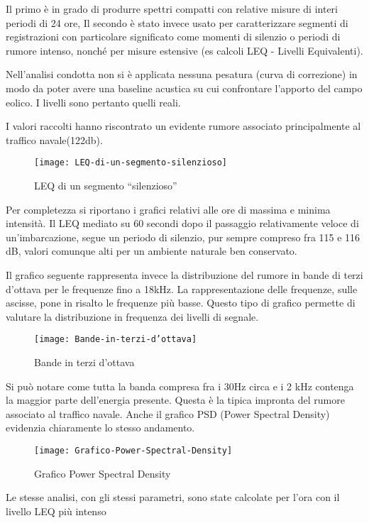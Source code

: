 Il primo è in grado di produrre spettri compatti con relative misure di interi periodi di 24 ore, Il secondo è stato invece usato per caratterizzare segmenti di registrazioni con particolare significato come momenti di silenzio o periodi di rumore intenso, nonché per misure estensive (es calcoli LEQ - Livelli Equivalenti).

Nell’analisi condotta non si è applicata nessuna pesatura (curva di correzione) in modo da poter avere una baseline acustica su cui confrontare l’apporto del campo eolico. 
I livelli sono pertanto quelli reali.

I valori raccolti hanno riscontrato un evidente rumore associato principalmente al traffico navale(122db). 
\begin{figure}[h]
\centering
\texttt{[image: LEQ-di-un-segmento-silenzioso]}
\caption{LEQ di un segmento “silenzioso”}
\end{figure}

Per completezza si riportano i grafici relativi alle ore di massima e minima intensità. 
Il LEQ mediato su 60 secondi dopo il passaggio relativamente veloce di un’imbarcazione, segue un periodo di silenzio, pur sempre compreso fra 115 e 116 dB, valori comunque alti per un ambiente naturale ben conservato.

Il grafico seguente rappresenta invece la distribuzione del rumore in bande di terzi d’ottava per le frequenze fino a 18kHz. 
La rappresentazione delle frequenze, sulle ascisse, pone in risalto le frequenze più basse. 
Questo tipo di grafico permette di valutare la distribuzione in frequenza dei livelli di segnale.

\begin{figure}[h]
\centering
\texttt{[image: Bande-in-terzi-d'ottava]}
\caption{Bande in terzi d’ottava}
\end{figure}

Si può notare come tutta la banda compresa fra i 30Hz circa e i 2 kHz contenga la maggior parte dell’energia presente. 
Questa è la tipica impronta del rumore associato al traffico navale. 
Anche il grafico PSD (Power Spectral Density) evidenzia chiaramente lo stesso andamento.

\begin{figure}[h]
\centering
\texttt{[image: Grafico-Power-Spectral-Density]}
\caption{Grafico Power Spectral Density}
\end{figure}

Le stesse analisi, con gli stessi parametri, sono state calcolate per l’ora con il livello LEQ più intenso 


